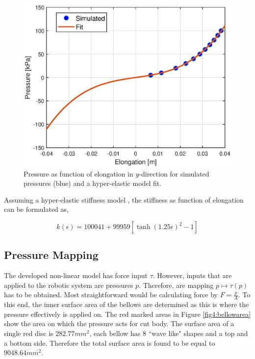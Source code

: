 \begin{figure}[H]
    \centering
    \includegraphics{Figures/Chapter3/pvselongatoin.eps}
    \caption{Pressure as function of elongation in $y$-direction for simulated pressures (blue) and a hyper-elastic model fit.}
    \label{fig3:pvsy}
\end{figure}


Assuming a hyper-elastic stiffness model \cite{Caasenbrood2020StiffnessModel}, the stiffness as function of elongation can be formulated as,


\begin{equation}
    k(\epsilon) =  100041 + 99959 [\tanh({1.25 \epsilon})^2 -1]
\end{equation}




\subsection{Pressure Mapping}

The developed non-linear model has force input $\tau$. However, inputs that are applied to the robotic system are pressures $p$. Therefore, are mapping $p \mapsto \tau(p)$ has to be obtained. Most straightforward would be calculating force by $F = \frac{p}{A}$. To this end, the inner surface area of the bellows are determined as this is where the pressure effectively is applied on. The red marked areas in Figure \ref{fig4:bellowarea} show the area on which the pressure acts for cut body. The surface area of a single red disc is $282.77 mm^2$, each bellow has 8 ``wave like" shapes and a top and a bottom side. Therefore the total surface area is found to be equal to $9048.64 mm^2$.

